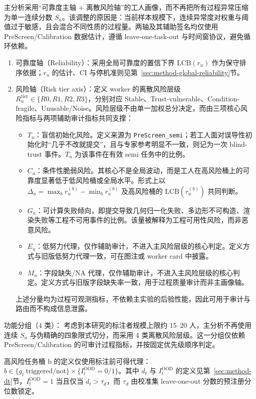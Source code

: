 主分析采用“可靠度主轴 + 离散风险轴”的工人画像，而不再把所有过程异常压缩为单一连续分数 $S_u$。该调整的原因是：当前样本规模下，连续异常度对权重与阈值过于敏感，且会混合不同性质的过程量。两轴及其辅助签名均仅使用 PreScreen/Calibration 数据估计，遵循 leave-one-task-out 与时间窗协议，避免循环依赖。
\begin{enumerate}
    \item 可靠度轴（Reliability）：采用全局可靠度的置信下界 $\mathrm{LCB}\left(r_u\right)$ 作为保守排序依据；$r_u$ 的估计、CI 与停机准则见第~\ref{sec:method-global-reliability}节。
    \item 风险轴（Risk tier axis）：定义 worker 的离散风险层级 $R_u^{\mathrm{tier}}\in\{R0,R1,R2,R3\}$，分别对应 Stable、Trust-vulnerable、Condition-fragile、Unusable/Noise。风险层级不由单一加权总分决定，而由三项核心风险指标与两项辅助审计指标共同支撑：
\begin{itemize}
    \item $T_u$：盲信初始化风险。定义来源为 \texttt{PreScreen\_semi}；若工人面对误导性初始化时“几乎不改就提交”，且与专家参考明显不一致，则记为一次 blind-trust 事件。$T_u$ 为该事件在有效 semi 任务中的比例。
    \item $C_u$：条件性脆弱风险。其核心不是全局波动，而是工人在高风险桶上的可靠度显著低于低风险桶或全局水平。形式上以 $\Delta_u=\max_b r_u^{(b)}-\min_b r_u^{(b)}$ 及高风险桶的 $\mathrm{LCB}(r_u^{(b)})$ 共同判断。
    \item $G_u$：可计算失败倾向，即提交导致几何归一化失败、多边形不可构造、渲染失败等工程不可用事件的比例。该量被解释为工程可用性风险，而非恶意风险。
    \item $E_u$：低努力代理，仅作辅助审计，不进入主风险层级的核心判定。定义方式与旧版低努力代理一致，可在图注或 worker card 中披露。
    \item $M_u$：字段缺失/NA 代理，仅作辅助审计，不进入主风险层级的核心判定。定义方式与旧版字段缺失率一致，用于过程质量审计而非主画像轴。
\end{itemize}
上述分量均为过程可观测指标，不依赖主实验的后验性能，因此可用于审计与路由而不构成信息泄露。
\end{enumerate}



功能分组（4 类）：
考虑到本研究的标注者规模上限约 15--20 人，主分析不再使用连续 $S_u$ 与伪精确的四象限式切分，而采用 4 类离散风险层级。这一分组仅依赖 PreScreen/Calibration 的可审计过程指标，并按固定优先级顺序判定。

高风险任务桶 b 的定义仅使用标注前可得代理：$b\in\{g_t\ \mathrm{triggered/not}\}\times\{I_t^{\mathrm{OOD}}=0/1\}$。其中 $d_t$ 与 $I_t^{\mathrm{OOD}}$ 的定义见第~\ref{sec:method-dt}节，$I_t^{\mathrm{OOD}}=1$ 当且仅当 $d_t>\tau_d$，而 $\tau_d$ 由校准集 leave-one-out 分数的预注册分位数锁定。

